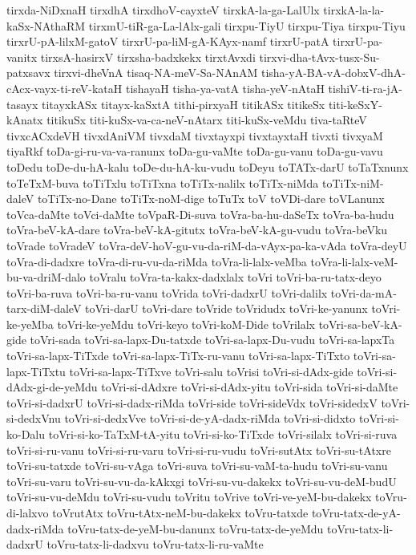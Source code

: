 {tirxda-NiDxnaH
tirxdhA
tirxdhoV-cayxteV
tirxkA-la-ga-LalUlx
tirxkA-la-la-kaSx-NAthaRM
tirxmU-tiR-ga-La-lAlx-gali
tirxpu-TiyU
tirxpu-Tiya
tirxpu-Tiyu
tirxrU-pA-lilxM-gatoV
tirxrU-pa-liM-gA-KAyx-namf
tirxrU-patA
tirxrU-pa-vanitx
tirxsA-hasirxV
tirxsha-badxkekx
tirxtAvxdi
tirxvi-dha-tAvx-tusx-Su-patxsavx
tirxvi-dheVnA
tisaq-NA-meV-Sa-NAnAM
tisha-yA-BA-vA-dobxV-dhA-cAcx-vayx-ti-reV-kataH
tishayaH
tisha-ya-vatA
tisha-yeV-nAtaH
tishiV-ti-ra-jA-tasayx
titayxkASx
titayx-kaSxtA
tithi-pirxyaH
titikASx
titikeSx
titi-keSxY-kAnatx
titikuSx
titi-kuSx-va-ca-neV-nAtarx
titi-kuSx-veMdu
tiva-taRteV
tivxcACxdeVH
tivxdAniVM
tivxdaM
tivxtayxpi
tivxtayxtaH
tivxti
tivxyaM
tiyaRkf
toDa-gi-ru-va-va-ranunx
toDa-gu-vaMte
toDa-gu-vanu
toDa-gu-vavu
toDedu
toDe-du-hA-kalu
toDe-du-hA-ku-vudu
toDeyu
toTATx-darU
toTaTxnunx
toTeTxM-buva
toTiTxlu
toTiTxna
toTiTx-nalilx
toTiTx-niMda
toTiTx-niM-daleV
toTiTx-no-Dane
toTiTx-noM-dige
toTuTx
toV
toVDi-dare
toVLanunx
toVca-daMte
toVci-daMte
toVpaR-Di-suva
toVra-ba-hu-daSeTx
toVra-ba-hudu
toVra-beV-kA-dare
toVra-beV-kA-gitutx
toVra-beV-kA-gu-vudu
toVra-beVku
toVrade
toVradeV
toVra-deV-hoV-gu-vu-da-riM-da-vAyx-pa-ka-vAda
toVra-deyU
toVra-di-dadxre
toVra-di-ru-vu-da-riMda
toVra-li-lalx-veMba
toVra-li-lalx-veM-bu-va-driM-dalo
toVralu
toVra-ta-kakx-dadxlalx
toVri
toVri-ba-ru-tatx-deyo
toVri-ba-ruva
toVri-ba-ru-vanu
toVrida
toVri-dadxrU
toVri-dalilx
toVri-da-mA-tarx-diM-daleV
toVri-darU
toVri-dare
toVride
toVridudx
toVri-ke-yanunx
toVri-ke-yeMba
toVri-ke-yeMdu
toVri-keyo
toVri-koM-Dide
toVrilalx
toVri-sa-beV-kA-gide
toVri-sada
toVri-sa-lapx-Du-tatxde
toVri-sa-lapx-Du-vudu
toVri-sa-lapxTa
toVri-sa-lapx-TiTxde
toVri-sa-lapx-TiTx-ru-vanu
toVri-sa-lapx-TiTxto
toVri-sa-lapx-TiTxtu
toVri-sa-lapx-TiTxve
toVri-salu
toVrisi
toVri-si-dAdx-gide
toVri-si-dAdx-gi-de-yeMdu
toVri-si-dAdxre
toVri-si-dAdx-yitu
toVri-sida
toVri-si-daMte
toVri-si-dadxrU
toVri-si-dadx-riMda
toVri-side
toVri-sideVdx
toVri-sidedxV
toVri-si-dedxVnu
toVri-si-dedxVve
toVri-si-de-yA-dadx-riMda
toVri-si-didxto
toVri-si-ko-Dalu
toVri-si-ko-TaTxM-tA-yitu
toVri-si-ko-TiTxde
toVri-silalx
toVri-si-ruva
toVri-si-ru-vanu
toVri-si-ru-varu
toVri-si-ru-vudu
toVri-sutAtx
toVri-su-tAtxre
toVri-su-tatxde
toVri-su-vAga
toVri-suva
toVri-su-vaM-ta-hudu
toVri-su-vanu
toVri-su-varu
toVri-su-vu-da-kAkxgi
toVri-su-vu-dakekx
toVri-su-vu-deM-budU
toVri-su-vu-deMdu
toVri-su-vudu
toVritu
toVrive
toVri-ve-yeM-bu-dakekx
toVru-di-lalxvo
toVrutAtx
toVru-tAtx-neM-bu-dakekx
toVru-tatxde
toVru-tatx-de-yA-dadx-riMda
toVru-tatx-de-yeM-bu-danunx
toVru-tatx-de-yeMdu
toVru-tatx-li-dadxrU
toVru-tatx-li-dadxvu
toVru-tatx-li-ru-vaMte
}
